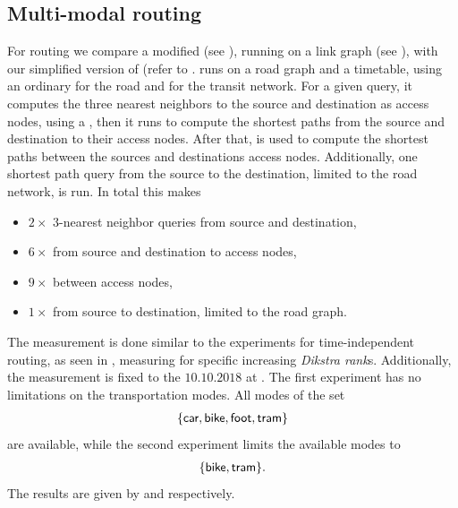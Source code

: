 \subsection{Multi-modal routing}
	For \multiModal routing we compare a modified \dijkstra (see ), running on a link graph (see ), with
	our simplified version of \anr (refer to . \anr runs on a road graph and a timetable, using an ordinary \dijkstra for the road
	and \csa for the transit network. For a given query, it computes the three nearest neighbors to the source and destination as access nodes,
	using a \coverTree, then it runs \dijkstra to compute the shortest paths from the source and destination to their access nodes. After that, \csa is
	used to compute the shortest paths between the sources and destinations access nodes. Additionally, one shortest path query from the source
	to the destination, limited to the road network, is run. In total this makes
	\begin{itemize}
		\item $2 \times$ $3$-nearest neighbor queries from source and destination,
		\item $6 \times$ \dijkstra from source and destination to access nodes,
		\item $9 \times$ \csa between access nodes,
		\item $1 \times$ \dijkstra from source to destination, limited to the road graph.
	\end{itemize}
	The measurement is done similar to the experiments for \uniModal time-independent routing, as seen
	in , measuring for specific increasing \textit{Dikstra rank}s. Additionally, the measurement is fixed
	to the $10.10.2018$ at . The first experiment has no limitations on the transportation modes. All modes of the set
	\begin{align*}
		\{\textsf{car}, \textsf{bike}, \textsf{foot}, \textsf{tram}\}
	\end{align*}
	are available, while the second experiment limits the available modes to
	\begin{align*}
		\{\textsf{bike}, \textsf{tram}\}.
	\end{align*}
	The results are given by  and  respectively.\\
